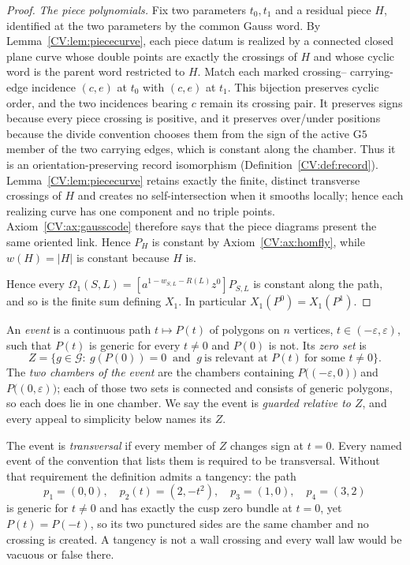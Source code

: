 \begin{proof}
\emph{The piece polynomials.} Fix two parameters $t_0,t_1$ and a residual
piece $H$, identified at the two parameters by the common Gauss word. By
Lemma~\ref{CV:lem:piececurve}, each piece datum is realized by a connected closed
plane curve whose double points are exactly the crossings of $H$ and whose
cyclic word is the parent word restricted to $H$. Match each marked crossing--
carrying-edge incidence $(c,e)$ at $t_0$ with $(c,e)$ at $t_1$. This bijection
preserves cyclic order, and the two incidences bearing $c$ remain its crossing
pair. It preserves signs because every piece crossing is positive, and it
preserves over/under
positions because the divide convention chooses them from the sign of the
active $\mathrm{G5}$ member of the two carrying edges, which is constant along
the chamber. Thus it is an orientation-preserving record isomorphism
(Definition~\ref{CV:def:record}). Lemma~\ref{CV:lem:piececurve} retains exactly
the finite, distinct transverse crossings of $H$
and creates no self-intersection when it smooths locally; hence each realizing
curve has one component and no triple points. Axiom~\ref{CV:ax:gausscode}
therefore says that the piece diagrams present the same oriented link. Hence
$P_H$ is constant by Axiom~\ref{CV:ax:homfly}, while $w(H)=|H|$ is constant because
$H$ is.

Hence every $\Omega_1(S,L)=[a^{1-w_{S,L}-R(L)}z^0]P_{S,L}$ is constant along the
path, and so is the finite sum defining $X_1$. In particular
$X_1(P^0)=X_1(P^1)$.
\end{proof}

\begin{definition}\label{CV:def:event}\leanok
An \emph{event} is a continuous path $t\mapsto P(t)$ of polygons on $n$
vertices, $t\in(-\varepsilon,\varepsilon)$, such that $P(t)$ is generic for
every $t\neq0$ and $P(0)$ is not. Its \emph{zero set} is
\[
   Z=\bigl\{g\in\mathcal G:\ g(P(0))=0\ \text{ and }\ g\ \text{is relevant at }
   P(t)\ \text{for some }t\neq0\bigr\}.
\]
The \emph{two chambers of the event} are the chambers containing
$P\bigl((-\varepsilon,0)\bigr)$ and $P\bigl((0,\varepsilon)\bigr)$; each of
those two sets is connected and consists of generic polygons, so each does lie
in one chamber. We say the event is \emph{guarded relative
to $Z$}, and every appeal to simplicity below names its $Z$.

The event is \emph{transversal} if every member of $Z$ changes sign at $t=0$.
Every named event of the convention that lists them is required to be
transversal. Without that requirement the definition admits a tangency: the
path
\[
   p_1=(0,0),\quad p_2(t)=(2,-t^2),\quad p_3=(1,0),\quad p_4=(3,2)
\]
is generic for $t\neq0$ and has exactly the cusp zero bundle at $t=0$, yet
$P(t)=P(-t)$, so its two punctured sides are the same chamber and no crossing
is created. A tangency is not a wall crossing and every wall law would be
vacuous or false there.
\end{definition}

